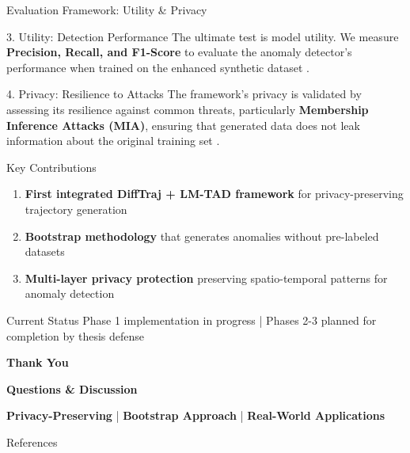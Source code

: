 \documentclass[aspectratio=169,xcolor={dvipsnames}]{beamer}
\begin{document}
\begin{frame}{Evaluation Framework: Utility \& Privacy}
    \begin{block}{3. Utility: Detection Performance}
        \small
        The ultimate test is model utility. We measure \textbf{Precision, Recall, and F1-Score} to evaluate the anomaly detector's performance when trained on the enhanced synthetic dataset \cite{mbuyaTrajectoryAnomalyDetection2024}.
    \end{block}

    \vspace{1em}
    
    \begin{alertblock}{4. Privacy: Resilience to Attacks}
        \small
        The framework's privacy is validated by assessing its resilience against common threats, particularly \textbf{Membership Inference Attacks (MIA)}, ensuring that generated data does not leak information about the original training set \cite{buchholzSystematisationKnowledgeTrajectory2024}.
    \end{alertblock}
\end{frame}

\begin{frame}{Key Contributions}
  \begin{block}{}
    \begin{enumerate}
      \item \textbf{First integrated DiffTraj + LM-TAD framework} for privacy-preserving trajectory generation
      \item \textbf{Bootstrap methodology} that generates anomalies without pre-labeled datasets
      \item \textbf{Multi-layer privacy protection} preserving spatio-temporal patterns for anomaly detection
    \end{enumerate}
  \end{block}
  
  \vspace{1em}
  \begin{alertblock}{Current Status}
    \centering
    Phase 1 implementation in progress | Phases 2-3 planned for completion by thesis defense
  \end{alertblock}
\end{frame}

\begin{frame}[plain]
  \centering
  \Huge \textbf{Thank You}
  
  \vspace{0.5em}
  \Large \textbf{Questions \& Discussion}
  
  \vspace{2em}
  \begin{block}{}
    \centering
    \textbf{Privacy-Preserving} | \textbf{Bootstrap Approach} | \textbf{Real-World Applications}
  \end{block}
\end{frame}

\begin{frame}[allowframebreaks]{References}
  \footnotesize
  \printbibliography[heading=none]
\end{frame}
\end{document}
